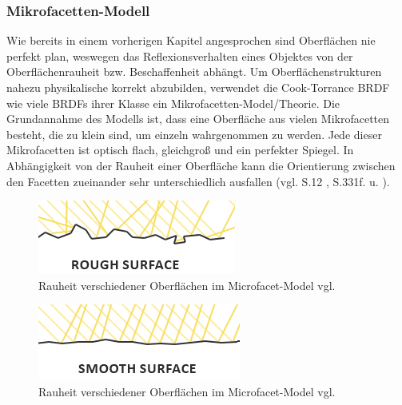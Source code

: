 \documentclass[
  11pt,
  a4paper,
  oneside
  ]{article}
\begin{document}
\subsubsection{Mikrofacetten-Modell }
Wie bereits in einem vorherigen Kapitel angesprochen sind Oberflächen nie perfekt plan, weswegen das Reflexionsverhalten eines Objektes von der Oberflächenrauheit bzw. Beschaffenheit abhängt. Um Oberflächenstrukturen nahezu physikalische korrekt abzubilden, verwendet die Cook-Torrance BRDF wie viele BRDFs ihrer Klasse ein Mikrofacetten-Model/Theorie. Die Grundannahme des Modells ist, dass eine Oberfläche aus vielen Mikrofacetten besteht, die zu klein sind, um einzeln wahrgenommen zu werden. Jede dieser Mikrofacetten ist optisch flach, gleichgroß und ein perfekter Spiegel. In Abhängigkeit von der Rauheit einer Oberfläche kann die Orientierung zwischen den Facetten zueinander sehr unterschiedlich ausfallen 
(vgl. S.12 \cite{rtrPaper}, S.331f. \cite{realTimeRendering4th} u. \cite{learnOpenGL}).
\begin{figure}[H]
  \centering
  \includegraphics*[width=0.9 \textwidth]{images/microfacets_light_rays1.png}
  \caption{Rauheit verschiedener Oberflächen im Microfacet-Model vgl. \cite{learnOpenGL}}
  \label{fig:img2_1}
\end{figure}
\begin{figure}[H]
  \centering
  \includegraphics*[width=0.9 \textwidth]{images/microfacets_light_rays2.png}
  \caption{Rauheit verschiedener Oberflächen im Microfacet-Model vgl. \cite{learnOpenGL}}
  \label{fig:img2_2}
\end{figure}
\end{document}
